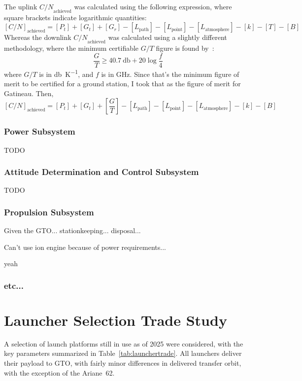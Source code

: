 \documentclass[9pt]{article}
\begin{document}
The uplink ${C/N}_\text{achieved}$ was calculated using the following expression, where square brackets indicate logarithmic quantities:
\begin{equation}\label{eq:uplinkachieved}
  [C/N]_\text{achieved}=[P_t] + [G_t] + [G_r] - [L_\text{path}] - [L_\text{point}] - [L_\text{atmosphere}] - [k] -[T]-[B]
\end{equation}
Whereas the downlink ${C/N}_\text{achieved}$ was calculated using a slightly different methodology, where the minimum certifiable $G/T$ figure is found by~\cite[I, p. 40]{commlinks}:
\begin{equation}\label{eq:minGT}
  \frac GT\ge \qty{40.7}{\decibel}+20\log{\frac f4}
\end{equation}
where $G/T$ is in \si{\decibel\per\kelvin}, and $f$ is in \si{\giga\hertz}.
Since that's the minimum figure of merit to be certified for a ground station, I took that as the figure of merit for Gatineau.
Then,
\begin{equation}\label{eq:downlinkachieved}
  [{C/N}]_\text{achieved}=[P_t]+[G_t]+\left[\frac GT\right]-[L_\text{path}]-[L_\text{point}]-[L_\text{atmosphere}]-[k]-[B]
\end{equation}

\subsubsection{Power Subsystem}
TODO
\subsubsection{Attitude Determination and Control Subsystem}
TODO
\subsubsection{Propulsion Subsystem}

Given the GTO... stationkeeping... disposal...

Can't use ion engine because of power requirements...\cite{next}

yeah
\subsubsection{etc...}


\section{Launcher Selection Trade Study}
A selection of launch platforms still in use as of 2025 were considered, with the key parameters summarized in Table~\ref{tab:launchertrade}.
All launchers deliver their payload to GTO, with fairly minor differences in delivered transfer orbit, with the exception of the Ariane~62.
\end{document}
